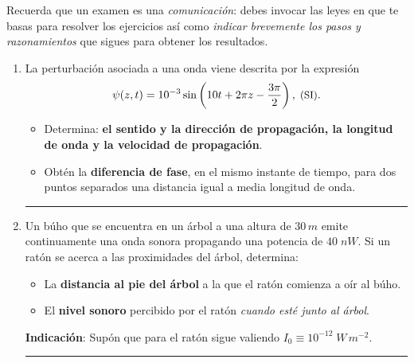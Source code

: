 \documentclass[a4paper,12pt]{exam}
\newcommand{\halmos}{\vspace*{-7mm}
	
					\begin{flushright}
						\rule{1mm}{2.5mm} 
					\end{flushright}\vspace*{-6mm}
						
					  }
\renewcommand{\qed}{\halmos}
\begin{document}
	
\vspace*{-5ex}

\vspace{2ex}

	
\begin{problemas}{Recuerda que un examen es una \textit{comunicación}: debes invocar las leyes en que te basas para resolver los ejercicios así como \textit{indicar brevemente los pasos y razonamientos} que sigues para obtener los resultados.}
\end{problemas}
\vspace{0ex}


\begin{enumerate}
	
		\item La perturbación asociada a una onda viene descrita por la expresión
$$\psi(z,t)= 10^{-3}\sin\left(10t +2\pi z-\frac{3\pi}{2}\right),\; \text{\small (SI)}.$$
	\begin{itemize}
		\item[a)] Determina: \textbf{el sentido y la dirección de propagación, la longitud de onda y la velocidad de propagación}.
		\item[b)] Obtén la \textbf{diferencia de fase}, en el mismo instante de tiempo, para dos puntos separados una distancia igual a media longitud de onda.
	\end{itemize}
	\qed
	\vspace{2ex}


	\item 	Un búho que se encuentra en un árbol a una altura de $30\,m$ emite continuamente una onda sonora propagando una potencia  de $40\;nW$. Si un ratón se acerca a las proximidades del árbol, determina:
			\begin{itemize}
				\item[a)] La \textbf{distancia al pie del árbol} a la que el ratón comienza a oír al búho.
           
				\item[b)] El \textbf{nivel sonoro} percibido por el ratón \textit{cuando esté junto al árbol}.
			\end{itemize}
			\vspace{0ex}
			
		 \begin{footnotesize} 
            	\textbf{Indicación}: Supón que para el ratón sigue valiendo $I_0\equiv 10^{-12}\;W\,m^{-2}$.			\end{footnotesize}
		\qed
		\vspace{2ex}



\end{enumerate}
\end{document}
